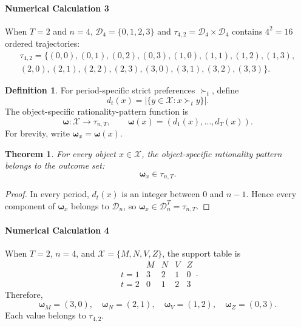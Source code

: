 \documentclass[conference]{IEEEtran}
\theoremstyle{plain}
\newtheorem{theorem}{Theorem}
\theoremstyle{definition}
\newtheorem{definition}{Definition}
\theoremstyle{remark}
\begin{document}
	\paragraph{Numerical Calculation 3}
	When $T=2$ and $n=4$, $\mathcal D_4=\{0,1,2,3\}$ and $\tau_{4,2}=\mathcal D_4\times\mathcal D_4$ contains $4^2=16$ ordered trajectories:
	\begin{multline*}
		\tau_{4,2}=\{(0,0),(0,1),(0,2),(0,3),
		(1,0),(1,1),(1,2),(1,3),\\
		(2,0),(2,1),(2,2),(2,3),
		(3,0),(3,1),(3,2),(3,3)\}.
	\end{multline*}
	\begin{definition}For period-specific strict preferences $\succ_t$, define
		\begin{equation}
			d_t(x)=\left|\{y\in\mathcal X:x\succ_t y\}\right|.
		\end{equation}
		The object-specific rationality-pattern function is
		\begin{equation}
			\boldsymbol\omega:\mathcal X\longrightarrow\tau_{n,T},
			\qquad
			\boldsymbol\omega(x)=(d_1(x),\ldots,d_T(x)).
		\end{equation}
		For brevity, write $\boldsymbol\omega_x=\boldsymbol\omega(x)$.
	\end{definition}
	\begin{theorem}\label{thm:omega-membership}
		For every object $x\in\mathcal X$, the object-specific rationality pattern belongs to the outcome set:
		\begin{equation}
			\boldsymbol\omega_x\in\tau_{n,T}.
		\end{equation}
	\end{theorem}
	\begin{proof}
		In every period, $d_t(x)$ is an integer between $0$ and $n-1$. Hence every component of $\boldsymbol\omega_x$ belongs to $\mathcal D_n$, so $\boldsymbol\omega_x\in\mathcal D_n^T=\tau_{n,T}$.
	\end{proof}
	\paragraph{Numerical Calculation 4}
	When $T=2$, $n=4$, and $\mathcal X=\{M,N,V,Z\}$, the support table is
	\begin{equation}
		\begin{array}{c|cccc}
		& M&N&V&Z\\ \hline
		t=1&3&2&1&0\\
		t=2&0&1&2&3
		\end{array}.
	\end{equation}
	Therefore,
	\begin{equation}
		\boldsymbol\omega_M=(3,0),\quad
		\boldsymbol\omega_N=(2,1),\quad
		\boldsymbol\omega_V=(1,2),\quad
		\boldsymbol\omega_Z=(0,3).
	\end{equation}
	Each value belongs to $\tau_{4,2}$.
\end{document}

